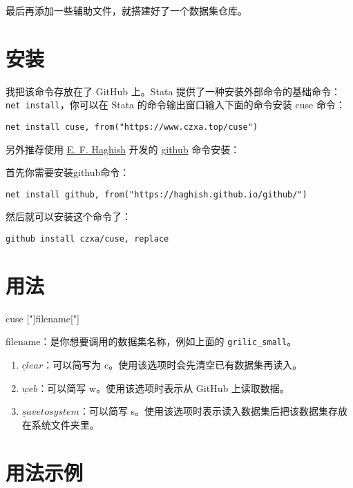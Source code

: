 \documentclass[lang=cn,11pt]{elegantpaper}
\begin{document}
最后再添加一些辅助文件，就搭建好了一个数据集仓库。

\section{安装}

我把该命令存放在了 GitHub 上。Stata 提供了一种安装外部命令的基础命令：\lstinline{net install}，你可以在 Stata 的命令输出窗口输入下面的命令安装 cuse 命令：

\begin{lstlisting}
net install cuse, from("https://www.czxa.top/cuse")
\end{lstlisting}

另外推荐使用 \href{https://github.com/haghish}{E. F. Haghish} 开发的 \href{https://github.com/haghish/github}{github} 命令安装：

首先你需要安装github命令：

\begin{lstlisting}
net install github, from("https://haghish.github.io/github/")
\end{lstlisting}

然后就可以安装这个命令了：

\begin{lstlisting}
github install czxa/cuse, replace
\end{lstlisting}

\section{用法}

\begin{stsyntax}
  \centering
  cuse
  ["]filename["]\
\end{stsyntax}

filename：是你想要调用的数据集名称，例如上面的 \lstinline{grilic_small}。

\begin{enumerate}
  \item $\underline{c}lear$：可以简写为 c。使用该选项时会先清空已有数据集再读入。
  \item $\underline{w}eb$：可以简写 w。使用该选项时表示从 GitHub 上读取数据。
  \item $\underline{s}avetosystem$：可以简写 s。使用该选项时表示读入数据集后把该数据集存放在系统文件夹里。
\end{enumerate}

\section{用法示例}
\end{document}
